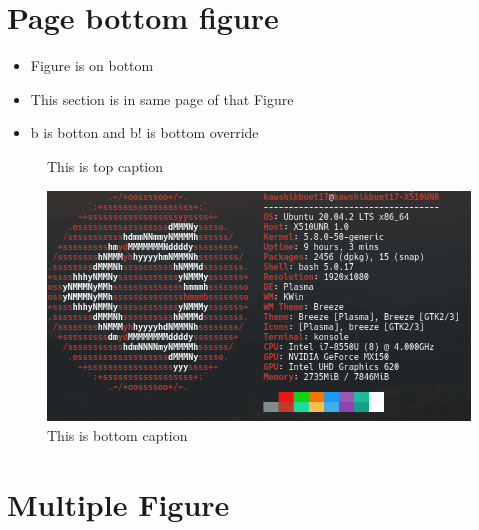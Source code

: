 \documentclass[14pt, a4paper]{article} %
\begin{document}
\pagebreak
\section{Page bottom figure}
\begin{itemize}
 \item Figure is on bottom
 \item This section is in same page of that Figure
 \item b is botton and b! is bottom override
\end{itemize}

\begin{figure}[b!]
    \centering
    \caption{This is top caption}
    \includegraphics[scale=0.4]{figure1.jpg}
    \caption{This is bottom caption}
\end{figure}


\pagebreak
\section{Multiple Figure}
\end{document}
